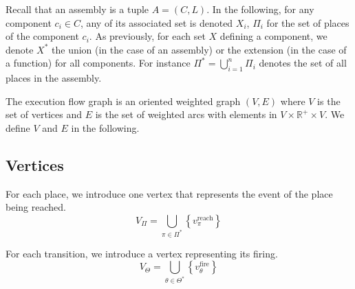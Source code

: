
Recall that an assembly is a tuple $A = (C,L)$. In the following, for
any component $c_i \in C$, any of its associated set is denoted
$X_i$, \eg $\Pi_i$ for the set of places of the component $c_i$.  As
previously, for each set $X$ defining a component, we denote $X^*$ the
union (in the case of an assembly) or the extension (in the case of a
function) for all components. For instance
$\Pi^*=\bigcup_{i=1}^{n}\Pi_i$ denotes the set of all places in the
assembly.

The execution flow graph is an oriented weighted graph $\left(V,E\right)$
where $V$ is the set of vertices and $E$ is the set of weighted
arcs with elements in $V\times \mathbb{R}^{+} \times V$. We define
$V$ and $E$ in the following.

\subsection{Vertices}

For each place, we introduce one vertex that represents the event of
the place being reached.
\[
V_{\Pi}=\bigcup_{\pi\in\Pi^*}\left\{ v_\pi^\text{reach}\right\} 
\]


For each transition, we introduce a vertex representing its firing.
\[
V_{\Theta}=\bigcup_{\theta\in\Theta^*}\left\{ v_\theta^\text{fire}\right\} 
\]


